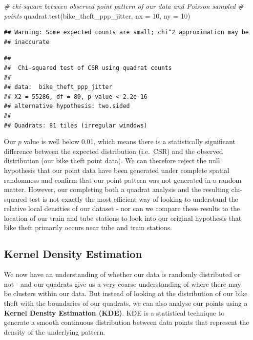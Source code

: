 \documentclass[
]{book}
\newenvironment{Shaded}{\begin{snugshade}}{\end{snugshade}}
\newcommand{\AttributeTok}[1]{\textcolor[rgb]{0.77,0.63,0.00}{#1}}
\newcommand{\CommentTok}[1]{\textcolor[rgb]{0.56,0.35,0.01}{\textit{#1}}}
\newcommand{\DecValTok}[1]{\textcolor[rgb]{0.00,0.00,0.81}{#1}}
\newcommand{\FunctionTok}[1]{\textcolor[rgb]{0.00,0.00,0.00}{#1}}
\newcommand{\NormalTok}[1]{#1}
\begin{document}
\begin{Shaded}
\begin{Highlighting}[]
\CommentTok{\# chi{-}square between observed point pattern of our data and Poisson sampled}
\CommentTok{\# points}
\FunctionTok{quadrat.test}\NormalTok{(bike\_theft\_ppp\_jitter, }\AttributeTok{nx =} \DecValTok{10}\NormalTok{, }\AttributeTok{ny =} \DecValTok{10}\NormalTok{)}
\end{Highlighting}
\end{Shaded}

\begin{verbatim}
## Warning: Some expected counts are small; chi^2 approximation may be
## inaccurate
\end{verbatim}

\begin{verbatim}
## 
##  Chi-squared test of CSR using quadrat counts
## 
## data:  bike_theft_ppp_jitter
## X2 = 55286, df = 80, p-value < 2.2e-16
## alternative hypothesis: two.sided
## 
## Quadrats: 81 tiles (irregular windows)
\end{verbatim}

Our \(p\) value is well below 0.01, which means there is a statistically significant difference between the expected distribution (i.e.~CSR) and the observed distribution (our bike theft point data). We can therefore reject the null hypothesis that our point data have been generated under complete spatial randomness and confirm that our point pattern was not generated in a random matter. However, our completing both a quadrat analysis and the resulting chi-squared test is not exactly the most efficient way of looking to understand the relative local densities of our dataset - nor can we compare these results to the location of our train and tube stations to look into our original hypothesis that bike theft primarily occurs near tube and train stations.

\hypertarget{kernel-density-estimation}{%
\subsection{Kernel Density Estimation}\label{kernel-density-estimation}}

We now have an understanding of whether our data is randomly distributed or not - and our quadrats give us a very coarse understanding of where there may be clusters within our data. But instead of looking at the distribution of our bike theft with the boundaries of our quadrats, we can also analyse our points using a \textbf{Kernel Density Estimation (KDE)}. KDE is a statistical technique to generate a smooth continuous distribution between data points that represent the density of the underlying pattern.
\end{document}
